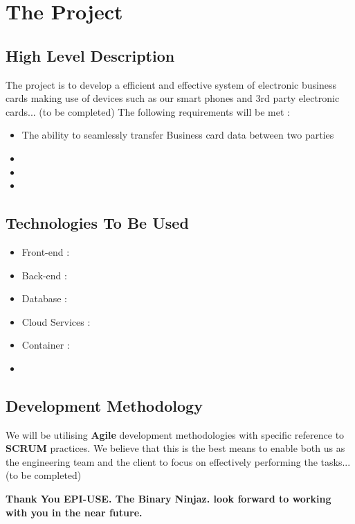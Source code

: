 \documentclass[11pt]{article}
\begin{document}
\section{The Project}
\subsection{High Level Description}
The project is to develop a efficient and effective system of electronic business cards making use of devices such as our smart phones and 3rd party electronic cards... (to be completed)
\newline
\newline The following requirements will be met : 
\begin{itemize}
\item The ability to seamlessly transfer Business card data between two parties
\item
\item
\item
\end{itemize}


\subsection{Technologies To Be Used}
\begin{itemize}
\item Front-end : 
\item Back-end : 
\item Database : 
\item Cloud Services : 
\item Container : 
\item 
\end{itemize}



\subsection{Development Methodology}
We will be utilising \textbf{Agile} development methodologies with specific reference to \textbf{SCRUM} practices. We believe that this is the best means to enable both us as the engineering team and the client to focus on effectively performing the tasks...(to be completed)

 
\begin{center}
{\sffamily\bfseries
\large Thank You EPI-USE. The Binary Ninjaz. look forward to working with you in the near future.
}
\end{center}
\end{document}
